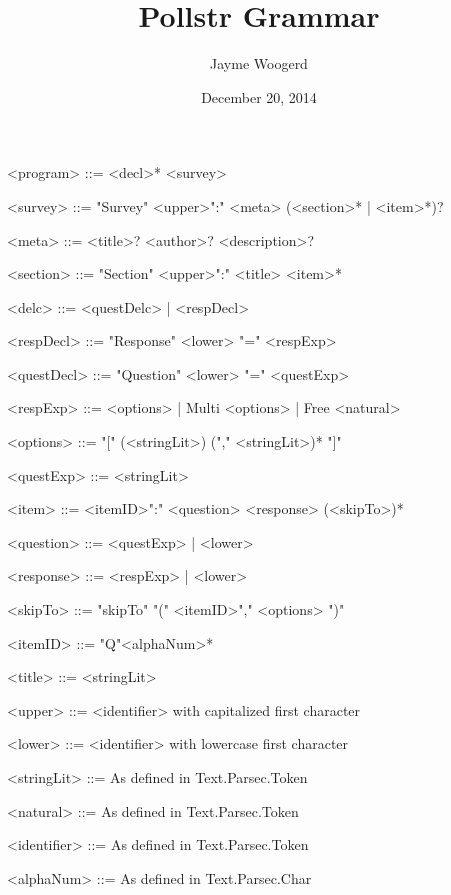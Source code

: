 \documentclass{article}
\title{Pollstr Grammar}
\author{Jayme Woogerd}
\date{December 20, 2014}
\begin{document}
\maketitle
\thispagestyle{empty}

\begin{grammar}

    <program>    ::= <decl>* <survey>

    <survey>     ::= "Survey"  <upper>":" <meta> (<section>* | <item>*)?

    <meta>       ::= <title>? <author>? <description>?

    <section>    ::= "Section" <upper>":" <title> <item>* 

    <delc>       ::= <questDelc> | <respDecl>

    <respDecl>   ::= "Response" <lower> "=" <respExp>

    <questDecl>  ::= "Question" <lower> "=" <questExp>

    <respExp>    ::= <options> | Multi <options> | Free <natural>

    <options>   ::= "[" (<stringLit>) ("," <stringLit>)* "]"

    <questExp>   ::= <stringLit>

    <item>       ::= <itemID>":" <question> <response> (<skipTo>)*

    <question>   ::= <questExp> | <lower>

    <response>   ::= <respExp> | <lower>

    <skipTo>     ::= "skipTo" "(" <itemID>"," <options> ")"

    <itemID>     ::= "Q"<alphaNum>*

    <title>      ::= <stringLit>

    <upper>      ::= <identifier> with capitalized first character
    
    <lower>      ::= <identifier> with lowercase first character

    <stringLit>  ::= As defined in Text.Parsec.Token

    <natural>    ::= As defined in Text.Parsec.Token

    <identifier> ::= As defined in Text.Parsec.Token

    <alphaNum> ::= As defined in Text.Parsec.Char


\end{grammar}
\end{document}
